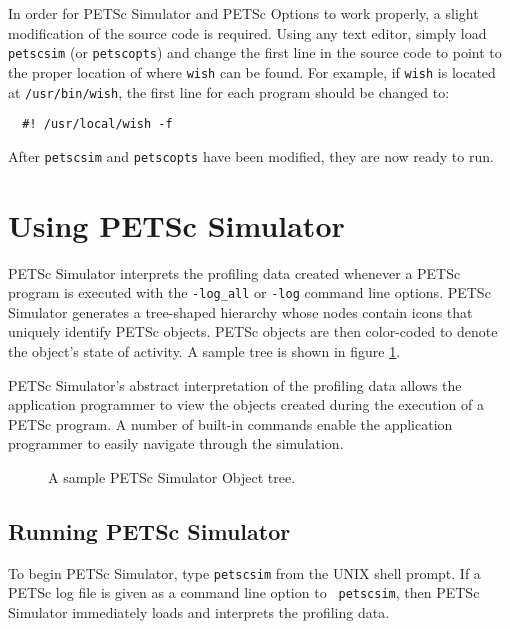 In order for PETSc Simulator and PETSc Options to work properly, a
slight modification of the source code is required.  Using any text
editor, simply load {\tt petscsim} (or {\tt petscopts}) and change the
first line in the source code to point to the proper location of where
{\tt wish} can be found.  For example, if {\tt wish} is located at
{\tt /usr/bin/wish}, the first line for each program should be changed
to:
\begin{verbatim}
  #! /usr/local/wish -f
\end{verbatim}
After {\tt petscsim} and {\tt petscopts} have been modified, they are
now ready to run.

\newpage
\section{Using PETSc Simulator}

PETSc Simulator interprets the profiling data created whenever a PETSc
program is executed with the {\tt -log\_all} or {\tt -log} command
line options.  PETSc Simulator generates a tree-shaped hierarchy whose
nodes contain icons that uniquely identify PETSc objects.  PETSc
objects are then color-coded to denote the object's state of activity.
A sample tree is shown in figure \ref{example tree}.

PETSc Simulator's abstract interpretation of the profiling data allows
the application programmer to view the objects created during the
execution of a PETSc program.  A number of built-in commands
enable the application programmer to easily navigate through the
simulation.

\begin{figure}
\centerline{}
\caption{A sample PETSc Simulator Object tree.}
\label{example tree}
\end{figure}

\subsection{Running PETSc Simulator}

To begin PETSc Simulator, type {\tt petscsim} from the UNIX shell
prompt.  If a PETSc log file is given as a command line option to {\tt
petscsim}, then PETSc Simulator immediately loads and interprets the
profiling data.

